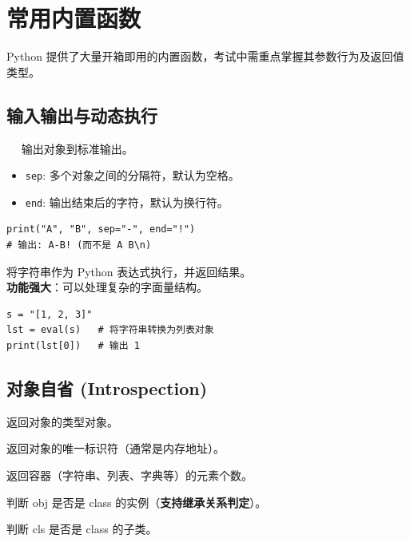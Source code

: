 \documentclass[12pt, a4paper]{article}
\begin{document}
\section{常用内置函数}

Python 提供了大量开箱即用的内置函数，考试中需重点掌握其参数行为及返回值类型。

\subsection{输入输出与动态执行}

\begin{description}[style=multiline, leftmargin=3cm]
    \item[print(*objects)] $\quad$
    输出对象到标准输出。
    \begin{itemize}
        \item \texttt{sep}: 多个对象之间的分隔符，默认为空格。
        \item \texttt{end}: 输出结束后的字符，默认为换行符。
    \end{itemize}
    \begin{lstlisting}
print("A", "B", sep="-", end="!") 
# 输出: A-B! (而不是 A B\n)
    \end{lstlisting}

    \item[eval] 
    将字符串作为 Python 表达式执行，并返回结果。
    \\ \textbf{功能强大}：可以处理复杂的字面量结构。
    \begin{lstlisting}
s = "[1, 2, 3]"
lst = eval(s)   # 将字符串转换为列表对象
print(lst[0])   # 输出 1
    \end{lstlisting}
\end{description}

\subsection{对象自省 (Introspection)}

\begin{description}[style=multiline, leftmargin=3cm]
    \item[type(obj)] 返回对象的类型对象。
    \item[id(obj)] 返回对象的唯一标识符（通常是内存地址）。
    \item[len(obj)] 返回容器（字符串、列表、字典等）的元素个数。
    
    \item[isinstance] 判断 obj 是否是 class 的实例（\textbf{支持继承关系判定}）。
    \item[issubclass] 判断 cls 是否是 class 的子类。
\end{description}
\end{document}
